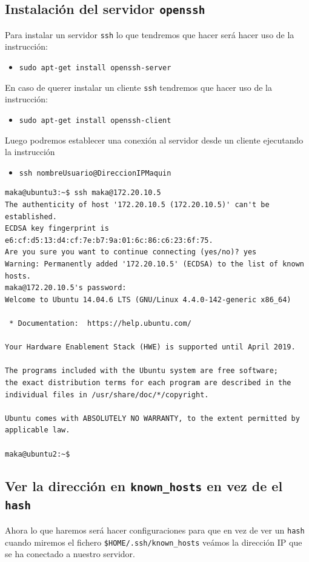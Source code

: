 \documentclass[11pt]{article}
\begin{document}
\subsection{Instalación del servidor \texttt{openssh}}
\label{sec:orga1e2789}
Para instalar un servidor \texttt{ssh} lo que tendremos que hacer será hacer uso de la instrucción:
\begin{itemize}
\item \texttt{sudo apt-get install openssh-server}
\end{itemize}


En caso de querer instalar un cliente \texttt{ssh} tendremos que hacer uso de la instrucción:
\begin{itemize}
\item \texttt{sudo apt-get install openssh-client}
\end{itemize}


Luego podremos establecer una conexión al servidor desde un cliente ejecutando la instrucción
\begin{itemize}
\item \texttt{ssh nombreUsuario@DireccionIPMaquin}
\end{itemize}
\begin{verbatim}
maka@ubuntu3:~$ ssh maka@172.20.10.5
The authenticity of host '172.20.10.5 (172.20.10.5)' can't be established.
ECDSA key fingerprint is e6:cf:d5:13:d4:cf:7e:b7:9a:01:6c:86:c6:23:6f:75.
Are you sure you want to continue connecting (yes/no)? yes
Warning: Permanently added '172.20.10.5' (ECDSA) to the list of known hosts.
maka@172.20.10.5's password: 
Welcome to Ubuntu 14.04.6 LTS (GNU/Linux 4.4.0-142-generic x86_64)

 * Documentation:  https://help.ubuntu.com/

Your Hardware Enablement Stack (HWE) is supported until April 2019.

The programs included with the Ubuntu system are free software;
the exact distribution terms for each program are described in the
individual files in /usr/share/doc/*/copyright.

Ubuntu comes with ABSOLUTELY NO WARRANTY, to the extent permitted by
applicable law.

maka@ubuntu2:~$
\end{verbatim}
\subsection{Ver la dirección en \texttt{known\_hosts} en vez de el \texttt{hash}}
\label{sec:org79900f9}
Ahora lo que haremos será hacer configuraciones para que en vez de ver un \texttt{hash} cuando miremos el fichero \texttt{\$HOME/.ssh/known\_hosts} veámos la dirección IP que se ha conectado a nuestro servidor.
\end{document}
